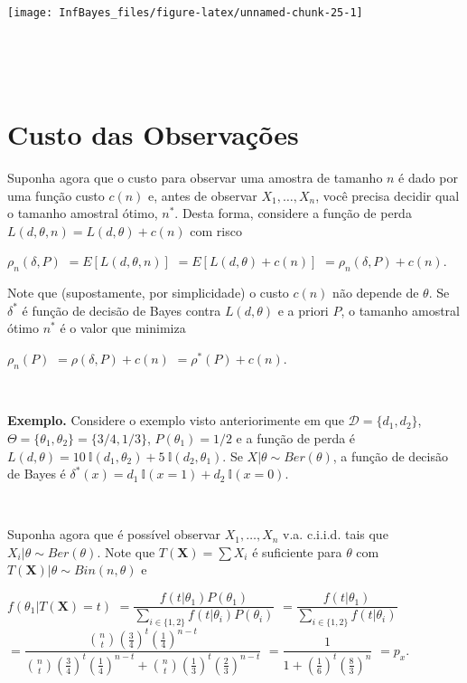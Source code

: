 \documentclass[
]{book}
\begin{document}
\begin{center}\texttt{[image: InfBayes\_files/figure-latex/unnamed-chunk-25-1]} \end{center}

\(~\)

\(~\)

\hypertarget{custo-das-observauxe7uxf5es}{%
\section{Custo das Observações}\label{custo-das-observauxe7uxf5es}}

Suponha agora que o custo para observar uma amostra de tamanho \(n\) é dado por uma função custo \(c(n)\) e, antes de observar \(X_1,\ldots,X_n\), você precisa decidir qual o tamanho amostral ótimo, \(n^*\). Desta forma, considere a função de perda \(L(d,\theta,n) = L(d,\theta) + c(n)\) com risco

\(\rho_n(\delta,P)\) \(= E\left[L(d,\theta,n)\right]\) \(= E\left[L(d,\theta) + c(n)\right]\) \(= \rho_n(\delta,P) + c(n)\).

Note que (supostamente, por simplicidade) o custo \(c(n)\) não depende de \(\theta\). Se \(\delta^*\) é função de decisão de Bayes contra \(L(d,\theta)\) e a priori \(P\), o tamanho amostral ótimo \(n^*\) é o valor que minimiza

\(\rho_n(P)\) \(= \rho(\delta,P) + c(n)\) \(= \rho^*(P) + c(n)\).

\(~\)

\textbf{Exemplo.} Considere o exemplo visto anteriorimente em que \(\mathcal{D}=\{d_1,d_2\}\), \(\Theta=\{\theta_1,\theta_2\}=\{3/4,1/3\}\), \(P(\theta_1)=1/2\) e a função de perda é \(L(d,\theta)=10~\mathbb{I}(d_1,\theta_2) + 5~\mathbb{I}(d_2,\theta_1)\). Se \(X|\theta \sim Ber(\theta)\), a função de decisão de Bayes é \(\delta^*(x)=d_1~\mathbb{I}(x=1)+d_2~\mathbb{I}(x=0)\).

\(~\)

Suponha agora que é possível observar \(X_1,\ldots,X_n\) v.a. c.i.i.d. tais que \(X_i|\theta \sim Ber(\theta)\). Note que \(T(\boldsymbol X)=\sum X_i\) é suficiente para \(\theta\) com \(T(\boldsymbol X)|\theta \sim Bin(n,\theta)\) e

\(f(\theta_1|T(\boldsymbol X)=t)\)
\(=\dfrac{f(t|\theta_1)P(\theta_1)}{\displaystyle \sum_{i\in\{1,2\}} f(t|\theta_i)P(\theta_i)}\)
\(=\dfrac{f(t|\theta_1)}{\displaystyle \sum_{i\in\{1,2\}} f(t|\theta_i)}\)
\(=\dfrac{\binom{n}{t}\left(\frac{3}{4}\right)^t\left(\frac{1}{4}\right)^{n-t}}{\binom{n}{t}\left(\frac{3}{4}\right)^t\left(\frac{1}{4}\right)^{n-t}+\binom{n}{t}\left(\frac{1}{3}\right)^t\left(\frac{2}{3}\right)^{n-t}}\)
\(=\dfrac{1}{1+\left(\frac{1}{6}\right)^t\left(\frac{8}{3}\right)^{n}}\) \(=p_x\).
\end{document}
